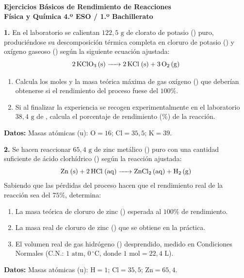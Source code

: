﻿\documentclass[11pt,a4paper]{article}
\begin{document}
\pagestyle{empty}

\begin{center}
    {\LARGE \textbf{Ejercicios Básicos de Rendimiento de Reacciones}}\\[4pt]
    {\large \textbf{Física y Química 4.º ESO / 1.º Bachillerato}}
\end{center}

\vspace{0.4cm}
\noindent\textbf{1.} En el laboratorio se calientan $122{,}5\text{ g}$ de clorato de potasio () puro, produciéndose su descomposición térmica completa en cloruro de potasio () y oxígeno gaseoso () según la siguiente ecuación ajustada:
\[
\ce{2 KClO3 (s) -> 2 KCl (s) + 3 O2 (g)}
\]

\begin{enumerate}[label=\textbf{\alph*)}, leftmargin=2em, itemsep=6pt]
    \item Calcula los moles y la masa teórica máxima de gas oxígeno () que deberían obtenerse si el rendimiento del proceso fuese del $100\%$.
    \item Si al finalizar la experiencia se recogen experimentalmente en el laboratorio $38{,}4\text{ g}$ de , calcula el porcentaje de rendimiento ($\%$) de la reacción.
\end{enumerate}

\vspace{0.25cm}
\noindent\textbf{Datos:} Masas atómicas ($\text{u}$): $\mathrm{O} = 16$; $\mathrm{Cl} = 35{,}5$; $\mathrm{K} = 39$.

\vspace{0.7cm}
\noindent\textbf{2.} Se hacen reaccionar $65{,}4\text{ g}$ de zinc metálico () puro con una cantidad suficiente de ácido clorhídrico () según la reacción ajustada:
\[
\ce{Zn (s) + 2 HCl (aq) -> ZnCl2 (aq) + H2 (g)}
\]
Sabiendo que las pérdidas del proceso hacen que el rendimiento real de la reacción sea del $75\%$, determina:
\begin{enumerate}[label=\textbf{\alph*)}, leftmargin=2em, itemsep=6pt]
    \item La masa teórica de cloruro de zinc () esperada al $100\%$ de rendimiento.
    \item La masa real de cloruro de zinc () que se obtiene en la práctica.
    \item El volumen real de gas hidrógeno () desprendido, medido en Condiciones Normales ($\text{C.N.}$: $1\text{ atm}$, $0\,^\circ\text{C}$, donde $1\text{ mol} = 22{,}4\text{ L}$).
\end{enumerate}

\vspace{0.25cm}
\noindent\textbf{Datos:} Masas atómicas ($\text{u}$): $\mathrm{H} = 1$; $\mathrm{Cl} = 35{,}5$; $\mathrm{Zn} = 65{,}4$.
\end{document}

